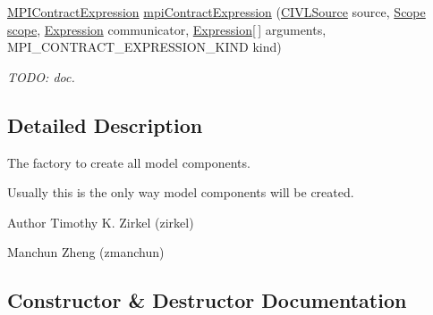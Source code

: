 \begin{DoxyCompactItemize}
\item 
\hyperlink{interfaceedu_1_1udel_1_1cis_1_1vsl_1_1civl_1_1model_1_1IF_1_1expression_1_1MPIContractExpression}{M\+P\+I\+Contract\+Expression} \hyperlink{classedu_1_1udel_1_1cis_1_1vsl_1_1civl_1_1model_1_1common_1_1CommonModelFactory_a27956386ef34e577bb8fd65880f18884}{mpi\+Contract\+Expression} (\hyperlink{interfaceedu_1_1udel_1_1cis_1_1vsl_1_1civl_1_1model_1_1IF_1_1CIVLSource}{C\+I\+V\+L\+Source} source, \hyperlink{interfaceedu_1_1udel_1_1cis_1_1vsl_1_1civl_1_1model_1_1IF_1_1Scope}{Scope} \hyperlink{classedu_1_1udel_1_1cis_1_1vsl_1_1civl_1_1model_1_1common_1_1CommonModelFactory_ace176067c807333f8832ee6b7ffcddfa}{scope}, \hyperlink{interfaceedu_1_1udel_1_1cis_1_1vsl_1_1civl_1_1model_1_1IF_1_1expression_1_1Expression}{Expression} communicator, \hyperlink{interfaceedu_1_1udel_1_1cis_1_1vsl_1_1civl_1_1model_1_1IF_1_1expression_1_1Expression}{Expression}\mbox{[}$\,$\mbox{]} arguments, M\+P\+I\+\_\+\+C\+O\+N\+T\+R\+A\+C\+T\+\_\+\+E\+X\+P\+R\+E\+S\+S\+I\+O\+N\+\_\+\+K\+I\+N\+D kind)
\begin{DoxyCompactList}\small\item\em T\+O\+D\+O\+: doc. \end{DoxyCompactList}\end{DoxyCompactItemize}


\subsection{Detailed Description}
The factory to create all model components. 

Usually this is the only way model components will be created.

\begin{DoxyAuthor}{Author}
Timothy K. Zirkel (zirkel) 

Manchun Zheng (zmanchun) 
\end{DoxyAuthor}


\subsection{Constructor \& Destructor Documentation}
\hypertarget{classedu_1_1udel_1_1cis_1_1vsl_1_1civl_1_1model_1_1common_1_1CommonModelFactory_a2a84120e1603ed93d824588c470ba593}{}
